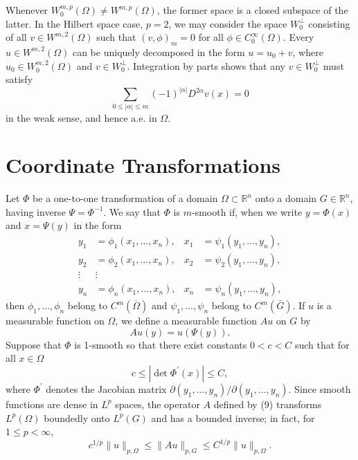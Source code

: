 \begin{para}
  Whenever $W_0^{m, p}(\Omega) \neq W^{m, p}(\Omega)$, the former space is a closed subspace of 
  the latter. In the Hilbert space case, $p=2$, we may consider the space $W_0^{\perp}$ consisting 
  of all $v \in W^{m, 2}(\Omega)$ such that $(v, \phi)_m=0$ for all $\phi \in C_0^{\infty}(\Omega)$.
  Every $u \in W^{m, 2}(\Omega)$ can be uniquely decomposed in the form $u=u_0+v$,
  where $u_0 \in W_0^{m, 2}(\Omega)$ and $v \in W_0^{\perp}$.
  Integration by parts shows that any $v \in W_0^{\perp}$ must satisfy
  \[
  \sum_{0 \leq|\alpha| \leq m}(-1)^{|\alpha|} D^{2 \alpha} v(x)=0
  \]
  in the weak sense, and hence a.e. in $\Omega$.
\end{para}


\section{Coordinate Transformations}

\begin{para}
  Let $\Phi$ be a one-to-one transformation of a domain $\Omega \subset \mathbb{R}^n$ onto
  a domain $G \in \mathbb{R}^n$, having inverse $\Psi=\Phi^{-1}$.
  We say that $\Phi$ is $m$-smooth if, when we write $y=\Phi(x)$ and $x=\Psi(y)$ in the form
  \[
  \begin{aligned}
  y_1 & =\phi_1\left(x_1, \ldots, x_n\right), & x_1 & =\psi_1\left(y_1, \ldots, y_n\right), \\
  y_2 & =\phi_2\left(x_1, \ldots, x_n\right), & x_2 & =\psi_2\left(y_1, \ldots, y_n\right), \\
  \vdots & \vdots & & \\
  y_n & =\phi_n\left(x_1, \ldots, x_n\right), & x_n & =\psi_n\left(y_1, \ldots, y_n\right),
  \end{aligned}
  \]
  then $\phi_1, \ldots, \phi_n$ belong to $C^m(\overline{\Omega})$ and $\psi_1, \ldots, \psi_n$
  belong to $C^m(\bar{G})$.
  If $u$ is a measurable function on $\Omega$, we define a measurable function $A u$ on $G$ by
  \begin{equation}\label{eq:3.9}
    A u(y)=u(\Psi(y)) .
  \end{equation}
  Suppose that $\Phi$ is 1-smooth so that there exist constants $0<c<C$ such that
  for all $x \in \Omega$
  \begin{equation}\label{eq:3.10}
    c \leq\left|\det \Phi^{\prime}(x)\right| \leq C,
  \end{equation}
  where $\Phi^{\prime}$ denotes the Jacobian matrix $\partial\left(y_1, \ldots, y_n\right) / \partial\left(y_1, \ldots, y_n\right)$.
  Since smooth functions are dense in $L^p$ spaces, the operator $A$ defined by (9)
  transforms $L^p(\Omega)$ boundedly onto $L^p(G)$ and has a bounded inverse;
  in fact, for $1 \leq p<\infty$,
  \[
  c^{1 / p}\|u\|_{p, \Omega} \leq\|A u\|_{p, G} \leq C^{1 / p}\|u\|_{p, \Omega} .
  \]
\end{para}


